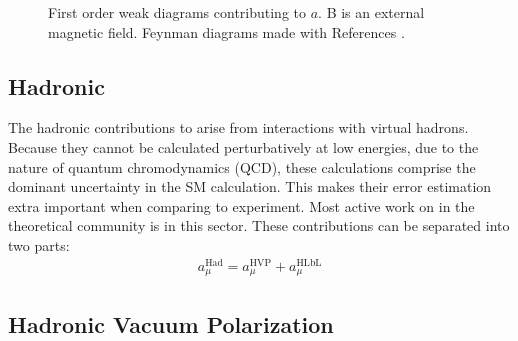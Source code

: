 \begin{figure}[]
\caption[Electroweak diagrams contributing to the magnetic moment]{First order weak diagrams contributing to $a$. B is an external magnetic field. Feynman diagrams made with References \cite{tikz-feynman,tikz-feynhand}.}	
\label{fig:EWDiagrams}
\end{figure}


\subsection{Hadronic}
\label{subsec:Hadronic}

The hadronic contributions to \amu arise from interactions with virtual hadrons. Because they cannot be calculated perturbatively at low energies, due to the nature of quantum chromodynamics (QCD), these calculations comprise the dominant uncertainty in the SM calculation. This makes their error estimation extra important when comparing to experiment. Most active work on \amu in the theoretical community is in this sector. These contributions can be separated into two parts:
		\begin{align}
            a_{\mu}^{\text{Had}} = a_{\mu}^{\text{HVP}} + a_{\mu}^{\text{HLbL}}
		\end{align}


\subsection*{Hadronic Vacuum Polarization}
\label{subsec:HVP}

